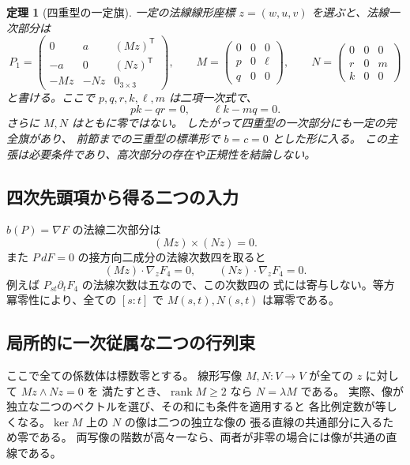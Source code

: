 \documentclass[11pt,a4paper]{ltjsarticle}
\newtheorem{theorem}{定理}[section]
\theoremstyle{remark}\newtheorem{remark}[theorem]{注意}
\begin{document}
\begin{theorem}[四重型の一定旗]\label{thm:v18-m4-flag}
一定の法線線形座標 $z=(w,u,v)$ を選ぶと、法線一次部分は
\[
 P_1=
 \begin{pmatrix}
 0&a&(Mz)^{\mathsf T}\\
 -a&0&(Nz)^{\mathsf T}\\
 -Mz&-Nz&0_{3\times3}
 \end{pmatrix},\qquad
 M=\begin{pmatrix}0&0&0\\p&0&\ell\\q&0&0\end{pmatrix},\qquad
 N=\begin{pmatrix}0&0&0\\r&0&m\\k&0&0\end{pmatrix}
\]
と書ける。ここで $p,q,r,k,\ell,m$ は二項一次式で、
\begin{equation}\label{eq:v18-m4-firstjet}
             pk-qr=0,\qquad \ell k-mq=0.
\end{equation}
さらに $M,N$ はともに零ではない。
したがって四重型の一次部分にも一定の完全旗があり、
前節までの三重型の標準形で $b=c=0$ とした形に入る。
この主張は必要条件であり、高次部分の存在や正規性を結論しない。
\end{theorem}

\subsection{四次先頭項から得る二つの入力}

$b(P)=\nabla F$ の法線二次部分は
\begin{equation}\label{eq:v18-m4-cross}
                    (Mz)\times(Nz)=0.
\end{equation}
また $P\,dF=0$ の接方向二成分の法線次数四を取ると
\begin{equation}\label{eq:v18-m4-invariants}
       (Mz)\cdot\nabla_zF_4=0,\qquad
       (Nz)\cdot\nabla_zF_4=0.
\end{equation}
例えば $P_{st}\partial_tF_4$ の法線次数は五なので、この次数四の
式には寄与しない。等方冪零性により、全ての $[s:t]$ で
$M(s,t),N(s,t)$ は冪零である。

\subsection{局所的に一次従属な二つの行列束}

ここで全ての係数体は標数零とする。
線形写像 $M,N:V\to V$ が全ての $z$ に対して $Mz\wedge Nz=0$ を
満たすとき、$\operatorname{rank}M\ge2$ なら $N=\lambda M$ である。
実際、像が独立な二つのベクトルを選び、その和にも条件を適用すると
各比例定数が等しくなる。$\ker M$ 上の $N$ の像は二つの独立な像の
張る直線の共通部分に入るため零である。
両写像の階数が高々一なら、両者が非零の場合には像が共通の直線である。
\end{document}
